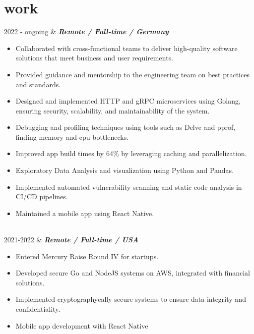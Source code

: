 \documentclass[]{cv-mauri}
\begin{document}
\section*{work}
\begin{tabularcv}
	2022 - ongoing   &   
					\textbf{\textit{Remote / Full-time / Germany}}

			\begin{itemize}
				\item Collaborated with cross-functional teams to deliver high-quality software solutions that meet business and user requirements.
				\item Provided guidance and mentorship to the engineering team on best practices and standards.
				\item Designed and implemented HTTP and gRPC microservices using Golang, ensuring security, scalability, and maintainability of the system.
				\item Debugging and profiling techniques using tools such as Delve and pprof, finding memory and cpu bottlenecks. 
				\item Improved app build times by 64\% by leveraging caching and parallelization.
				\item Exploratory Data Analysis and visualization using Python and Pandas.
				\item Implemented automated vulnerability scanning and static code analysis in CI/CD pipelines.
				\item Maintained a mobile app using React Native.
			\end{itemize}
					\\[\vspacepar]

	2021-2022   &   
					\textbf{\textit{Remote / Full-time / USA}}

			\begin{itemize}
				\item Entered Mercury Raise Round IV for startups.
				\item Developed secure Go and NodeJS systems on AWS, integrated with financial solutions.
				\item Implemented cryptographycally secure systems to ensure data integrity and confidentiality.
				\item Mobile app development with React Native
			\end{itemize}
					\\[\vspacepar]
	

\end{tabularcv}
\end{document}
